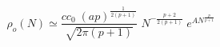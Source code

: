 \begin{equation}\label{rhoN0}
\rho_o(N) \simeq \frac{c c_0 \; (a p)^{\frac{1}{2 (p + 1)}}}
{\sqrt{2 \pi (p + 1)}} \; N^{- \frac{p + 2}{2 (p + 1)}} 
\; e^{A N^{\frac{p}{p + 1}}}  
\end{equation}

